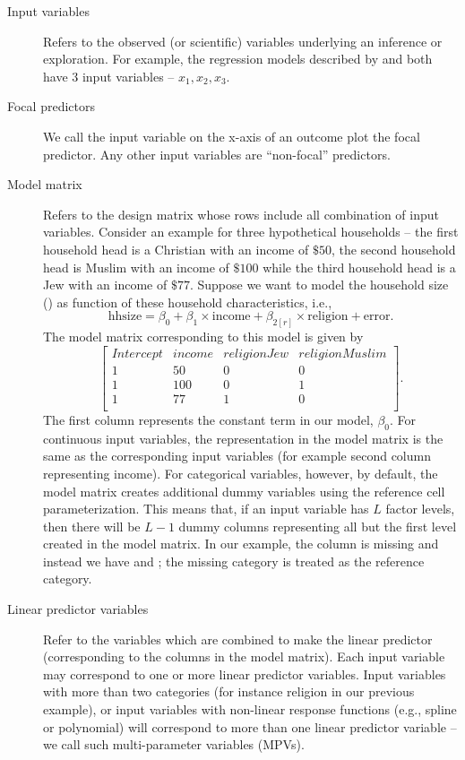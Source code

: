 \begin{description}
\item [Input variables] Refers to the observed (or scientific) variables underlying an inference or exploration. For example, the regression models described by  and  both have $3$ input variables -- $x_1, x_2, x_3$.
\item [Focal predictors] We call the input variable on the x-axis of an outcome plot the focal predictor.  Any other input variables are ``non-focal'' predictors. 

\item [Model matrix] Refers to the design matrix whose rows include all combination of input variables. Consider an example for three hypothetical households -- the first household head is a Christian with an income of $\$ 50$, the second household head is Muslim with an income of $\$ 100$ while the third household head is a Jew with an income of $\$ 77$. Suppose we want to model the household size () as function of these household characteristics, i.e., $$\mathrm{hhsize} = \beta_0 + \beta_1\times\mathrm{income} + \beta_{2[r]}\times\mathrm{religion} + \mathrm{error}.$$ The model matrix corresponding to this model is given by
$$\begin{bmatrix}{}
 Intercept & income & religionJew & religionMuslim \\
 1 & 50 & 0 & 0 \\
  1 & 100 & 0 & 1 \\
  1 & 77 & 1 & 0 \\
\end{bmatrix}.$$ The first column represents the constant term in our model, $\beta_0$. For continuous input variables, the representation in the model matrix is the same as the corresponding input variables (for example second column representing income). For categorical variables, however, by default, the model matrix  creates additional dummy variables using the reference cell parameterization. This means that, if an input variable has $L$ factor levels, then there will be $L-1$ dummy columns representing all but the first level created in the model matrix. In our example, the column  is missing and instead we have  and ; the missing category  is treated as the reference category.

\item [Linear predictor variables] Refer to the variables which are combined to make the linear predictor (corresponding to the columns in the model matrix). Each input variable may correspond to one or more linear predictor variables. Input variables with more than two categories (for instance religion in our previous example), or input variables with non-linear response functions (e.g., spline or polynomial) will correspond to more than one linear predictor variable -- we call such multi-parameter variables (MPVs).


\end{description}
